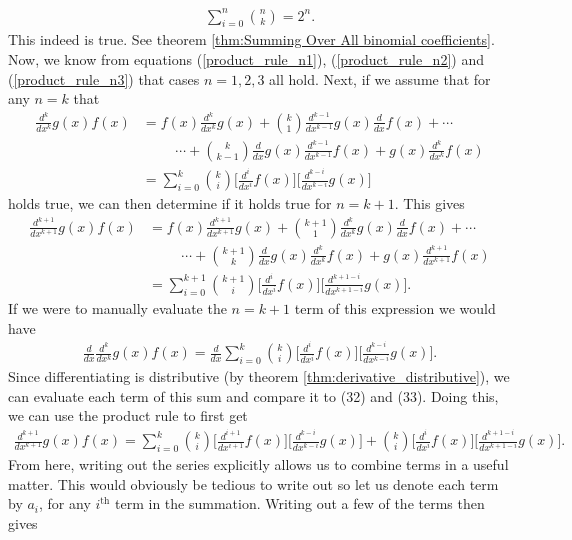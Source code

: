\begin{align}
	\sum_{i=0}^{n}{{n}\choose{k}} = 2^n.
\end{align}
This indeed is true. See theorem \ref{thm:Summing Over All binomial coefficients}. Now, we know from equations (\ref{product_rule_n1}), (\ref{product_rule_n2}) and (\ref{product_rule_n3}) that cases $n=1,2,3$ all hold. Next, if we assume that for any $n=k$ that
\begin{align}
	\frac{d^k}{dx^k}g(x)f(x)&=f(x)\frac{d^k}{dx^k}g(x)+{{k}\choose{1}}\frac{d^{k-1}}{dx^{k-1}}g(x)\frac{d}{dx}f(x)+\cdots \nonumber\\
	&\hspace{1cm}\cdots+{{k}\choose{k-1}}\frac{d}{dx}g(x)\frac{d^{k-1}}{dx^{k-1}}f(x)+g(x)\frac{d^k}{dx^k}f(x) \\
	&=\sum_{i=0}^{k}{{k}\choose{i}}\bigg[\frac{d^i}{dx^i}f(x) \bigg]\bigg[\frac{d^{k-i}}{dx^{k-i}}g(x) \bigg]
\end{align}
holds true, we can then determine if it holds true for $n=k+1$. This gives
\begin{align}
	\frac{d^{k+1}}{dx^{k+1}}g(x)f(x)&=f(x)\frac{d^{k+1}}{dx^{k+1}}g(x)+{{{k+1}}\choose{1}}\frac{d^{k}}{dx^{k}}g(x)\frac{d}{dx}f(x)+\cdots \nonumber\\
	&\hspace{1cm}\cdots+{{k+1}\choose{k}}\frac{d}{dx}g(x)\frac{d^{k}}{dx^{k}}f(x)+g(x)\frac{d^{k+1}}{dx^{k+1}}f(x) \\
	&=\sum_{i=0}^{k+1}{{k+1}\choose{i}}\bigg[\frac{d^i}{dx^i}f(x) \bigg]\bigg[\frac{d^{k+1-i}}{dx^{k+1-i}}g(x) \bigg].
\end{align}
If we were to manually evaluate the $n=k+1$ term of this expression we would have
\begin{align}
	\frac{d}{dx}\frac{d^{k}}{dx^{k}}g(x)f(x)= \frac{d}{dx}\sum_{i=0}^{k}{{k}\choose{i}}\bigg[\frac{d^i}{dx^i}f(x) \bigg]\bigg[\frac{d^{k-i}}{dx^{k-i}}g(x) \bigg].
\end{align}
Since differentiating is distributive (by theorem \ref{thm:derivative_distributive}), we can evaluate each term of this sum and compare it to (32) and (33). Doing this, we can use the product rule to first get
\begin{align}
	\frac{d^{k+1}}{dx^{k+1}}g(x)f(x)=\sum_{i=0}^{k}{{k}\choose{i}}\bigg[\frac{d^{i+1}}{dx^{i+1}}f(x) \bigg]\bigg[\frac{d^{k-i}}{dx^{k-i}}g(x) \bigg]+{{k}\choose{i}}\bigg[\frac{d^i}{dx^i}f(x) \bigg]\bigg[\frac{d^{k+1-i}}{dx^{k+1-i}}g(x) \bigg]. 
\end{align}
From here, writing out the series explicitly allows us to combine terms in a useful matter. This would obviously be tedious to write out so let us denote each term by $a_i$, for any $i^{\textrm{th}}$ term in the summation. Writing out a few of the terms then gives
